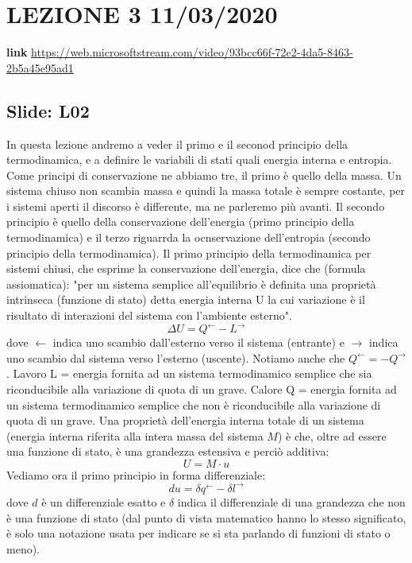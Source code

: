 \section{LEZIONE 3 11/03/2020}
\textbf{link} \url{https://web.microsoftstream.com/video/93bcc66f-72e2-4da5-8463-2b5a45e95ad1}
\subsection{Slide: L02}
In questa lezione andremo a veder il primo e il seconod principio della termodinamica, e a definire le variabili di stati quali energia interna e entropia.\newline
Come principi di conservazione ne abbiamo tre, il primo è quello della massa. Un sistema chiuso non scambia massa e quindi la massa totale è sempre costante, per i sistemi aperti il discorso è differente, ma ne parleremo più avanti. Il secondo principio è quello della conservazione dell'energia (primo principio della termodinamica) e il terzo riguarrda la ocnservazione dell'entropia (secondo principio della termodinamica).\newline
Il primo principio della termodinamica per sistemi chiusi, che esprime la conservazione dell'energia, dice che (formula assiomatica): "per un sistema semplice all'equilibrio è definita una proprietà intrinseca (funzione di stato) detta energia interna U la cui variazione è il risultato di interazioni del sistema con l'ambiente esterno".
\[
    \Delta U = Q^{\leftarrow} - L^{\rightarrow}
\]
dove $\leftarrow$ indica uno scambio dall'esterno verso il sistema (entrante) e $\rightarrow$ indica uno scambio dal sistema verso l'esterno (uscente).\newline
Notiamo anche che $Q^{\leftarrow} = -Q^{\rightarrow}$.
Lavoro L = energia fornita ad un sistema termodinamico semplice che sia riconducibile alla variazione di quota di un grave.\newline
Calore Q = energia fornita ad un sistema termodinamico semplice che non è riconducibile alla variazione di quota di un grave.\newline
Una proprietà dell'energia interna totale di un sistema (energia interna riferita alla intera massa del sistema $M$) è che, oltre ad essere una funzione di stato, è una grandezza estensiva e perciò additiva: 
\[
    U = M \cdot u
\]
Vediamo ora il primo principio in forma differenziale:
\[
    du =  \delta q^{\leftarrow } - \delta l^{\rightarrow }
\]
dove $d$ è un differenziale esatto e $\delta$ indica il differenziale di una grandezza che non è una funzione di stato (dal punto di vista matematico hanno lo stesso significato, è solo una notazione usata per indicare se si sta parlando di funzioni di stato o meno).\newline
